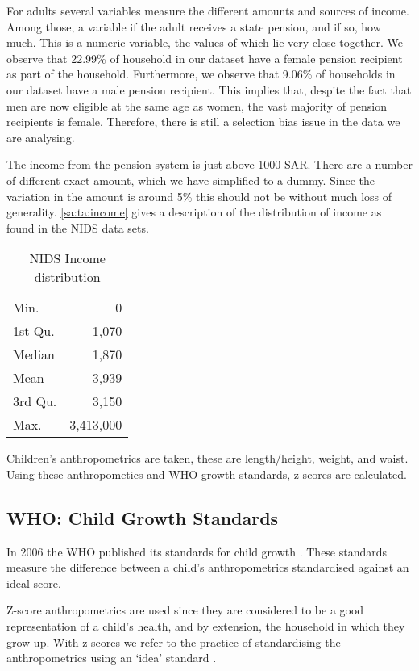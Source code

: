\begin{refsection}
For adults several variables measure the different amounts and sources of income.
Among those, a variable if the adult receives a state pension, and if so, how much.
This is a numeric variable, the values of which lie very close together.
We observe that 22.99\% of household in our dataset have a female pension recipient as part of the household.
Furthermore, we observe that 9.06\% of households in our dataset have a male pension recipient.
This implies that, despite the fact that men are now eligible at the same age as women,
the vast majority of pension recipients is female.
Therefore, there is still a selection bias issue in the data we are analysing.

The income from the pension system is just above 1000 SAR.
There are a number of different exact amount, which we have simplified to a dummy.
Since the variation in the amount is around 5\% this should not be without much loss of generality.
\autoref{sa:ta:income} gives a description of the distribution of income as found in the NIDS data sets.

\begin{table}[hb!]
\centering
\caption{NIDS Income distribution}
\label{sa:ta:income}
\begin{tabular}{l|r}
\hline
  Min. & 0 \\
  1st Qu. & 1,070 \\
  Median & 1,870 \\
  Mean & 3,939 \\
  3rd Qu. & 3,150 \\
  Max. & 3,413,000 \\
\end{tabular}
\end{table}

Children's anthropometrics are taken, these are length/height, weight, and waist.
Using these anthropometics and WHO growth standards, z-scores are calculated.


\subsection{WHO: Child Growth Standards}
\label{sa:data:who}
In 2006 the WHO published its standards for child growth \parencite{who2006child}.
These standards measure the difference between a child's anthropometrics
standardised against an ideal score.

Z-score anthropometrics are used since they are considered to be a good representation of a child's health,
and by extension, the household in which they grow up.
With z-scores we refer to the practice of standardising the anthropometrics using an `idea' standard \parencite{who2006child}.


\end{refsection}
